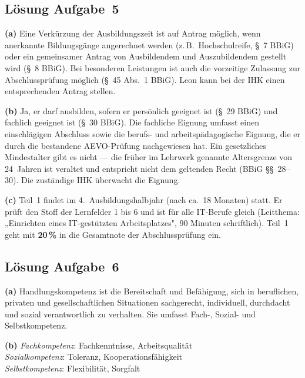 \documentclass[11pt, a4paper]{article}
\begin{document}
\subsection*{Lösung Aufgabe~5}
\begin{loesung}
\textbf{(a)} Eine Verkürzung der Ausbildungszeit ist auf Antrag möglich, wenn anerkannte Bildungsgänge angerechnet werden (z.\,B.\ Hochschulreife, §~7 BBiG) oder ein gemeinsamer Antrag von Ausbildendem und Auszubildendem gestellt wird (§~8 BBiG). Bei besonderen Leistungen ist auch die vorzeitige Zulassung zur Abschlussprüfung möglich (§~45 Abs.~1 BBiG). Leon kann bei der IHK einen entsprechenden Antrag stellen.

\textbf{(b)} Ja, er darf ausbilden, sofern er persönlich geeignet ist (§~29 BBiG) und fachlich geeignet ist (§~30 BBiG). Die fachliche Eignung umfasst einen einschlägigen Abschluss sowie die berufs- und arbeitspädagogische Eignung, die er durch die bestandene AEVO-Prüfung nachgewiesen hat. Ein gesetzliches Mindestalter gibt es nicht --- die früher im Lehrwerk genannte Altersgrenze von 24~Jahren ist veraltet und entspricht nicht dem geltenden Recht (BBiG §§~28--30). Die zuständige IHK überwacht die Eignung.

\textbf{(c)} Teil~1 findet im 4.~Ausbildungshalbjahr (nach ca.\ 18 Monaten) statt. Er prüft den Stoff der Lernfelder 1 bis 6 und ist für alle IT-Berufe gleich (Leitthema: „Einrichten eines IT-gestützten Arbeitsplatzes", 90 Minuten schriftlich). Teil~1 geht mit \textbf{20\,\%} in die Gesamtnote der Abschlussprüfung ein.
\end{loesung}

\subsection*{Lösung Aufgabe~6}
\begin{loesung}
\textbf{(a)} Handlungskompetenz ist die Bereitschaft und Befähigung, sich in beruflichen,
privaten und gesellschaftlichen Situationen sachgerecht, individuell, durchdacht und sozial
verantwortlich zu verhalten. Sie umfasst Fach-, Sozial- und Selbstkompetenz.

\textbf{(b)}
\emph{Fachkompetenz}: Fachkenntnisse, Arbeitsqualität\\
\emph{Sozialkompetenz}: Toleranz, Kooperationsfähigkeit\\
\emph{Selbstkompetenz}: Flexibilität, Sorgfalt
\end{loesung}
\end{document}
